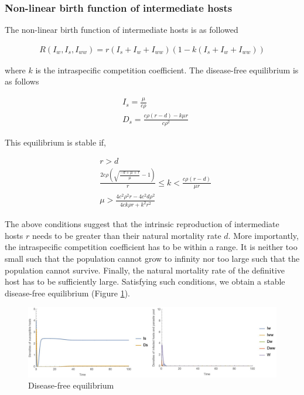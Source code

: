 \documentclass{article}
\begin{document}
\subsubsection{Non-linear birth function of intermediate hosts}
The non-linear birth function of intermediate hosts is as followed

\begin{align*}
R(I_w, I_s,I_{ww}) = r (I_s + I_w + I_{ww}) (1 - k (I_s + I_w + I_{ww}))
\end{align*}

where $k$ is the intraspecific competition coefficient. The disease-free equilibrium is as follows

\begin{align*}
& I_s = \frac{\mu}{c \rho } \\
& D_s = \frac{c \rho  (r-d) - k \mu  r}{c \rho ^2}
\end{align*}

This equilibrium is stable if,

\begin{align*}
& r > d \\
& \frac{2 c \rho  \left(\sqrt{\frac{-d+\mu +r}{\mu }}-1\right)}{r}\leq k < \frac{c \rho  (r-d)}{\mu  r} \\
& \mu >\frac{4 c^2 \rho ^2 r - 4 c^2 d \rho ^2}{4 c k \rho r + k^2 r^2}
\end{align*}

The above conditions suggest that the intrinsic reproduction of intermediate hosts $r$ needs to be greater than their natural mortality rate $d$. 
More importantly, the intraspecific competition coefficient has to be within a range. 
It is neither too small such that the population cannot grow to infinity nor too large such that the population cannot survive. 
Finally, the natural mortality rate of the definitive host has to be sufficiently large. Satisfying such conditions, we obtain a stable disease-free equilibrium (Figure \ref{fig:diseasefree:nonlinear}).

\begin{figure}
\includegraphics[width=\textwidth]{Figures/diseasefree_nonlinear}
\caption{Disease-free equilibrium}
\label{fig:diseasefree:nonlinear}
\end{figure}
\end{document}
